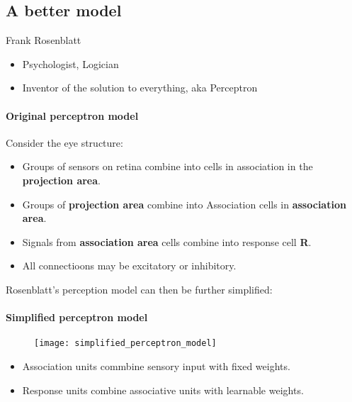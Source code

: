 \subsection{A better model}
Frank Rosenblatt
\begin{itemize}
	\item Psychologist, Logician
	\item Inventor of the solution to everything, aka Perceptron
\end{itemize}

\paragraph{Original perceptron model}
Consider the eye structure:
\begin{itemize}
	\item Groups of sensors on retina combine into cells in association in the \textbf{projection area}.
	\item Groups of \textbf{projection area} combine into Association cells in \textbf{association area}.
	\item Signals from \textbf{association area} cells combine into response cell \textbf{R}.
	\item All connectioons may be excitatory or inhibitory.
\end{itemize}

Rosenblatt's perception model can then be further simplified:
\paragraph{Simplified perceptron model}

\begin{figure}[h]
	\centering
	\texttt{[image: simplified\_perceptron\_model]}
\end{figure}


\begin{itemize}
	\item Association units commbine sensory input with fixed weights.
	\item Response units combine associative units with learnable weights.
\end{itemize}